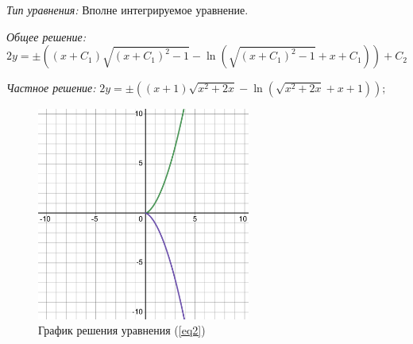 \begin{enumerate}
                \textit{Тип уравнения:}
                    Вполне интегрируемое уравнение.
                
                \textit{Общее решение:}
                    \[ 
                        2y = \pm\left( (x + C_1) \sqrt{(x+C_1)^2 - 1} - \ln \left( \sqrt{(x+C_1)^2 - 1} + x + C_1 \right) \right) + C_2 
                    \]
                
                \textit{Частное решение:}
                    \( 
                        2y = \pm\left((x + 1) \sqrt{x^2 + 2x} - \ln \left( \sqrt{x^2 + 2x} + x + 1 \right)\right);
                    \)

                \begin{figure}[H]
                    \centering
                    \includegraphics[width=7cm]{pictures/task2_2.pdf}
                    \caption{График решения уравнения (\ref{eq2})}
                \end{figure}

        \end{enumerate}